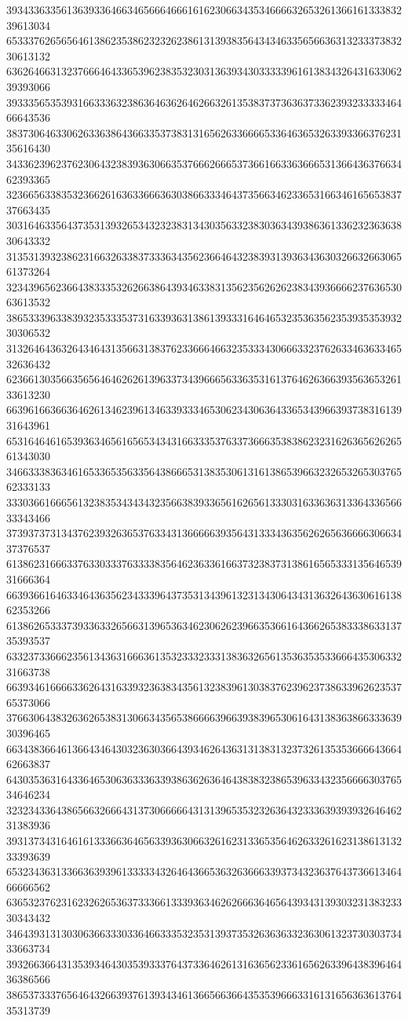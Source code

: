 39343363356136393364663465666466616162306634353466663265326136616133383239613034
65333762656564613862353862323262386131393835643434633565663631323337383230613132
63626466313237666464336539623835323031363934303333396161383432643163306239393066
39333565353931663336323863646362646266326135383737363637336239323333346466643536
38373064633062633638643663353738313165626336666533646365326339336637623135616430
34336239623762306432383936306635376662666537366166336366653136643637663462393365
32366563383532366261636336663630386633346437356634623365316634616565383737663435
30316463356437353139326534323238313430356332383036343938636133623236363830643332
31353139323862316632633837333634356236646432383931393634363032663266306561373264
32343965623664383335326266386439346338313562356262623834393666623763653063613532
38653339633839323533353731633936313861393331646465323536356235393535393230306532
31326464363264346431356631383762336664663235333430666332376263346363346532636432
62366130356635656464626261396337343966656336353161376462636639356365326133613230
66396166366364626134623961346339333465306234306364336534396639373831613931643961
65316464616539363465616565343431663335376337366635383862323162636562626561343030
34663338363461653365356335643866653138353061316138653966323265326530376562333133
33303661666561323835343434323566383933656162656133303163363631336433656633343466
37393737313437623932636537633431366666393564313334363562626563666630663437376537
61386231666337633033376333383564623633616637323837313861656533313564653931666364
66393661646334643635623433396437353134396132313430643431363264363061613862353266
61386265333739336332656631396536346230626239663536616436626538333863313735393537
63323733666235613436316663613532333233313836326561353635353366643530633231663738
66393461666633626431633932363834356132383961303837623962373863396262353765373066
37663064383263626538313066343565386666396639383965306164313836386633363930396465
66343836646136643464303236303664393462643631313831323732613535366664366462663837
64303536316433646530636333633938636263646438383238653963343235666630376534646234
32323433643865663266643137306666643131396535323263643233363939393264646231383936
39313734316461613336636465633936306632616231336535646263326162313861313233393639
65323436313366363939613333343264643665363263666339373432363764373661346466666562
63653237623162326265363733366133393634626266636465643934313930323138323330343432
34643931313030636633303364663335323531393735326363633236306132373030373433663734
39326636643135393464303539333764373364626131636562336165626339643839646436386566
38653733376564643266393761393434613665663664353539666331613165636361376435313739
